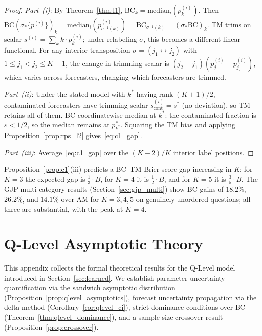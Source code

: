 \begin{proof}
\emph{Part~(i)}: By Theorem~\ref{thm:l1}, $\mathrm{BC}_k = \mathrm{median}_i(p^{(i)}_k)$.
Then $\mathrm{BC}(\sigma_*\{p^{(i)}\})_k = \mathrm{median}_i(p^{(i)}_{\sigma^{-1}(k)}) =
\mathrm{BC}_{\sigma^{-1}(k)} = (\sigma_*\mathrm{BC})_k$.
TM trims on scalar $s^{(i)} = \sum_k k\cdot p^{(i)}_k$; under relabeling $\sigma$, this
becomes a different linear functional.  For any interior transposition $\sigma = (j_1 \leftrightarrow j_2)$
with $1 \le j_1 < j_2 \le K-1$, the change in trimming scalar is
$(j_2 - j_1)(p^{(i)}_{j_1} - p^{(i)}_{j_2})$, which varies across forecasters, changing
which forecasters are trimmed.

\emph{Part~(ii)}: Under the stated model with $k^*$ having rank $(K+1)/2$, contaminated
forecasters have trimming scalar $s^{(i)}_{\mathrm{cont}} = s^*$ (no deviation), so TM
retains all of them.  BC coordinatewise median at $k^*$: the contaminated fraction is
$\varepsilon < 1/2$, so the median remains at $p^*_{k^*}$.  Squaring the TM bias and
applying Proposition~\ref{prop:rps_l2} gives~\eqref{eq:c1_gap}.

\emph{Part~(iii)}: Average~\eqref{eq:c1_gap} over the $(K-2)/K$ interior label positions.
\end{proof}

\begin{remark}
Proposition~\ref{prop:c1}(iii) predicts a BC--TM Brier score gap increasing in $K$:
for $K=3$ the expected gap is $\frac{1}{3}\cdot B$, for $K=4$ it is $\frac{1}{2}\cdot B$,
and for $K=5$ it is $\frac{3}{5}\cdot B$.
The GJP multi-category results (Section~\ref{sec:gjp_multi}) show BC gains of $18.2\%$,
$26.2\%$, and $14.1\%$ over AM for $K=3,4,5$ on genuinely unordered questions; all three are substantial, with the peak at $K=4$.
\end{remark}


\section{Q-Level Asymptotic Theory}
\label{app:qlevel_theory}

This appendix collects the formal theoretical results for the Q-Level model introduced
in Section~\ref{sec:learned}.  We establish parameter uncertainty quantification via the
sandwich asymptotic distribution (Proposition~\ref{prop:qlevel_asymptotics}),
forecast uncertainty propagation via the delta method (Corollary~\ref{cor:qlevel_ci}),
strict dominance conditions over BC (Theorem~\ref{thm:qlevel_dominance}), and a
sample-size crossover result (Proposition~\ref{prop:crossover}).

